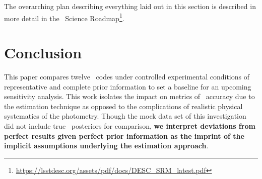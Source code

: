 
The overarching plan describing everything laid out in this section is described in more detail in the \desc\ Science Roadmap\footnote{\url{https://lsstdesc.org/assets/pdf/docs/DESC\_SRM\_latest.pdf}}.

\section{Conclusion}

This paper compares twelve \pzpdf\ codes under controlled experimental conditions of representative and complete prior information to set a baseline for an upcoming sensitivity analysis.
This work isolates the impact on metrics of \pzpdf\ accuracy due to the estimation technique as opposed to the complications of realistic physical systematics of the photometry.
Though the mock data set of this investigation did not include true \pz\ posteriors for comparison, \textbf{we interpret deviations from perfect results given perfect prior information as the imprint of the implicit assumptions underlying the estimation approach}.

